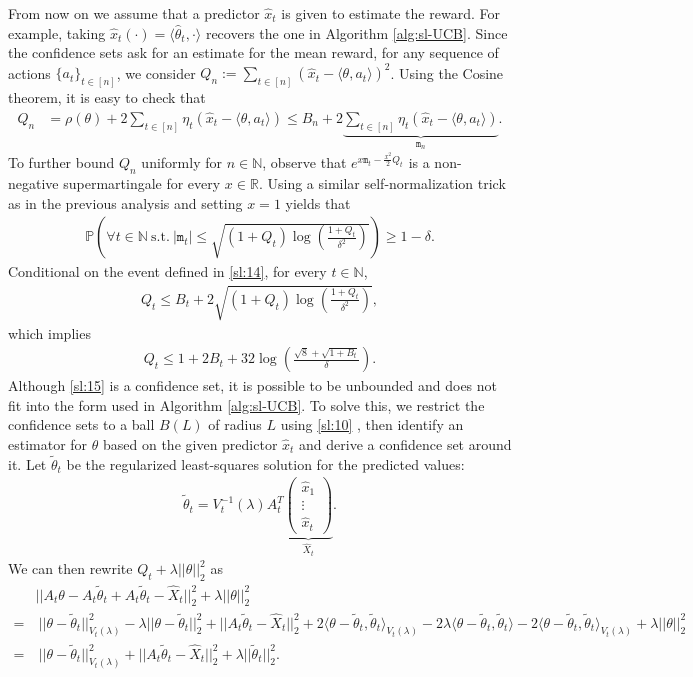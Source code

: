 \documentclass[10pt,a4article]{amsart}
\numberwithin{equation}{section}
\theoremstyle{plain}
\theoremstyle{definition}
\def\R{{\mathbb R}}
\def\N{{\mathbb N}}
\def\R{{\mathbb R}}
\def\P{{\mathbb P}}
\def\t{{\theta}}
\begin{document}
From now on we assume that a predictor $\hat{x}_t$ is given to estimate the reward. For example, taking $\hat{x}_t (\cdot)= \langle\hat{\t}_t, \cdot\rangle$ recovers the one in Algorithm \ref{alg:sl-UCB}. Since the confidence sets ask for an estimate for the mean reward, for any sequence of actions $\{a_t\}_{t\in [n]}$, we consider $Q_n := \sum_{t\in [n]}(\hat{x}_t-\langle\t, a_t\rangle)^2$. Using the Cosine theorem, it is easy to check that 
\begin{align*}
Q_n&=\rho(\t)+2\sum_{t\in [n]}\eta_t(\hat{x}_t-\langle\t, a_t\rangle)\leq B_n+2\underbrace{\sum_{t\in [n]}\eta_t(\hat{x}_t-\langle\t, a_t\rangle)}_{\texttt{m}_n}.
\end{align*}
To further bound $Q_n$ uniformly for $n\in\N$, observe that $e^{x\texttt{m}_t-\frac{x^2}{2}Q_t}$ is a non-negative supermartingale for every $x\in\R$. Using a similar self-normalization trick as in the previous analysis and setting $x = 1$ yields that 
\begin{align}
\P\left(\forall t\in\N \ \text{s.t.}\  |\texttt{m}_t|\leq\sqrt{(1+Q_t)\log\left(\frac{1+Q_t}{\delta^2}\right)} \right)\geq 1-\delta. \label{sl:14}
\end{align}
Conditional on the event defined in \eqref{sl:14}, for every $t\in\N$, 
\begin{align*}
Q_t\leq B_t + 2\sqrt{(1+Q_t)\log\left(\frac{1+Q_t}{\delta^2}\right)},
\end{align*}
which implies
\begin{align}
Q_t\leq 1+2B_t+32\log\left(\frac{\sqrt{8}+\sqrt{1+B_t}}{\delta}\right).\label{sl:15}
\end{align}
Although \eqref{sl:15} is a confidence set, it is possible to be unbounded and does not fit into the form used in Algorithm \ref{alg:sl-UCB}. To solve this, we restrict the confidence sets to a ball $B(L)$ of radius $L$ using \eqref{sl:10} , then identify an estimator for $\t$ based on the given predictor $\hat{x}_t$ and derive a confidence set around it. Let $\tilde{\t}_t$ be the regularized least-squares solution for the predicted values:
\begin{align*}
\tilde{\t}_t = V_t^{-1}(\lambda)A_t^T\underbrace{\begin{pmatrix}
\hat{x}_1\\
\vdots\\
\hat{x}_t
\end{pmatrix}}_{\hat{X}_t}.
\end{align*}
We can then rewrite $Q_t+\lambda ||\t||_2^2$ as 
\begin{align*}
&||A_t\t-A_t\tilde{\t}_t+A_t\tilde{\t}_t-\hat{X}_t||_2^2 + \lambda ||\t||_2^2\\
=&\  ||\t-\tilde\t_t||^2_{V_t(\lambda)} -\lambda ||\t-\tilde\t_t||_2^2 + ||A_t\tilde{\t}_t-\hat{X}_t||_2^2+2\langle\t-\tilde\t_t, \tilde\t_t\rangle_{V_t(\lambda)}-2\lambda \langle \t-\tilde \t_t, \tilde\t_t\rangle-2\langle\t-\tilde\t_t, \tilde\t_t\rangle_{V_t(\lambda)}+\lambda ||\t||_2^2\\
=&\ ||\t-\tilde\t_t||^2_{V_t(\lambda)}+ ||A_t\tilde{\t}_t-\hat{X}_t||_2^2+\lambda ||\tilde\t_t||_2^2.
\end{align*} 
\end{document}
